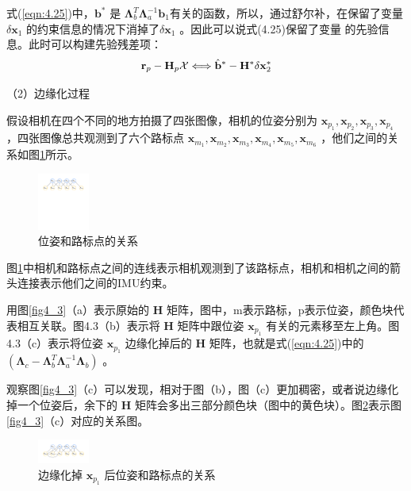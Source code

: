 式(\ref{eqn:4.25})中，$\mathbf{b}^{*} $ 是 $\bm{\Lambda}_{b}^{T} \bm{\Lambda}_{a}^{-1} \mathbf{b}_{1} $有关的函数，所以，通过舒尔补，在保留了变量 $\delta \mathbf{x}_1 $ 的约束信息的情况下消掉了$\delta \mathbf{x}_1 $ 。因此可以说式(4.25)保留了变量 的先验信息。此时可以构建先验残差项：
\begin{equation}
\label{eqn:4.26}
\setlength{\abovedisplayskip}{6pt}
\setlength{\belowdisplayskip}{6pt}
\mathbf{r}_p-\mathbf{H}_p\mathcal{X} \Longleftrightarrow 
\hat{\mathbf{b}}^{*} - \mathbf{H}^{*} \delta \mathbf{x}_{2}^{*}
\end{equation}

（2）边缘化过程

假设相机在四个不同的地方拍摄了四张图像，相机的位姿分别为 $ \mathbf{x}_{p_1},  \mathbf{x}_{p_2},  \mathbf{x}_{p_3},  \mathbf{x}_{p_4} $ ，四张图像总共观测到了六个路标点 $ \mathbf{x}_{m_1},  \mathbf{x}_{m_2}, \mathbf{x}_{m_3}, \mathbf{x}_{m_4}, \mathbf{x}_{m_5}, \mathbf{x}_{m_6}$ ，他们之间的关系如图\ref{fig4_2}所示。
\begin{figure}[h]\setlength{\belowcaptionskip}{-12pt}
	\centering
	\includegraphics[width=0.15\textwidth, angle=-90]{figures/chapter4/fig4_2}
	\caption{位姿和路标点的关系}\label{fig4_2}
\end{figure}
图\ref{fig4_2}中相机和路标点之间的连线表示相机观测到了该路标点，相机和相机之间的箭头连接表示他们之间的IMU约束。

用图\ref{fig4_3}（a）表示原始的 $\mathbf{H} $ 矩阵，图中，m表示路标，p表示位姿，颜色块代表相互关联。图4.3（b）表示将 $\mathbf{H} $ 矩阵中跟位姿 $\mathbf{x}_{p_1} $ 有关的元素移至左上角。图4.3（c）表示将位姿 $\mathbf{x}_{p_1} $ 边缘化掉后的 $\mathbf{H} $ 矩阵，也就是式(\ref{eqn:4.25})中的$\left( \bm{\Lambda}_{c}-\bm{\Lambda}_{b}^{T} \bm{\Lambda}_{a}^{-1} \bm{\Lambda}_{b}\right) $ 。

观察图\ref{fig4_3}（c）可以发现，相对于图（b），图（c）更加稠密，或者说边缘化掉一个位姿后，余下的 $\mathbf{H} $ 矩阵会多出三部分颜色块（图中的黄色块）。图\ref{fig4_4}表示图\ref{fig4_3}（c）对应的关系图。
\begin{figure}[h]\setlength{\belowcaptionskip}{-12pt}
	\centering
	\includegraphics[width=0.15\textwidth, angle=-90]{figures/chapter4/fig4_4}
	\caption{边缘化掉 $\mathbf{x}_{p_1} $ 后位姿和路标点的关系}\label{fig4_4}
\end{figure}

